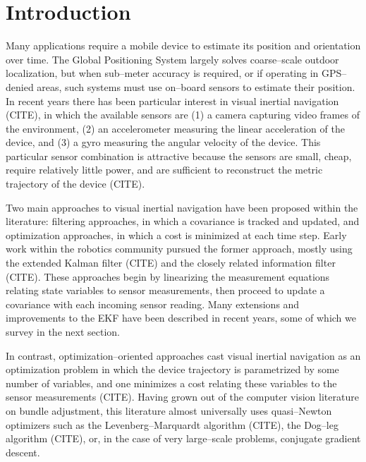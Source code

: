 \section{Introduction}

Many applications require a mobile device to estimate its position and orientation over time. The Global Positioning System largely solves coarse--scale outdoor localization, but when sub--meter accuracy is required, or if operating in GPS--denied areas, such systems must use on--board sensors to estimate their position. In recent years there has been particular interest in visual inertial navigation (CITE), in which the available sensors are (1) a camera capturing video frames of the environment, (2) an accelerometer measuring the linear acceleration of the device\footnotemark, and (3) a gyro measuring the angular velocity of the device. This particular sensor combination is attractive because the sensors are small, cheap, require relatively little power, and are sufficient to reconstruct the metric trajectory of the device (CITE).


Two main approaches to visual inertial navigation have been proposed within the literature: filtering approaches, in which a covariance is tracked and updated, and optimization approaches, in which a cost is minimized at each time step. Early work within the robotics community pursued the former approach, mostly using the extended Kalman filter (CITE) and the closely related information filter (CITE). These approaches begin by linearizing the measurement equations relating state variables to sensor measurements, then proceed to update a covariance with each incoming sensor reading. Many extensions and improvements to the EKF have been described in recent years, some of which we survey in the next section.

In contrast, optimization--oriented approaches cast visual inertial navigation as an optimization problem in which the device trajectory is parametrized by some number of variables, and one minimizes a cost relating these variables to the sensor measurements (CITE). Having grown out of the computer vision literature on bundle adjustment, this literature almost universally uses quasi--Newton optimizers such as the Levenberg--Marquardt algorithm (CITE), the Dog--leg algorithm (CITE), or, in the case of very large--scale problems, conjugate gradient descent.

